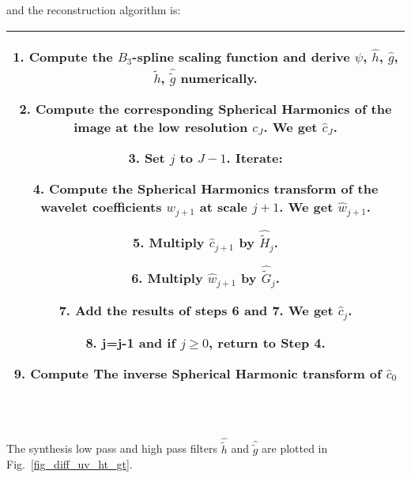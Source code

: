 and the reconstruction algorithm is:
\begin{center}
\begin{tabular}{|c|} \hline
\begin{minipage}[b]{5.3in}
\vspace{0.1in}

\small{
\textsf{1. Compute the $B_3$-spline scaling function and derive $\hat \psi$, $\hat h$, $\hat g$, ${\hat {\tilde h}}$, ${\hat {\tilde g}}$ numerically.}

\textsf{2. Compute the corresponding Spherical Harmonics of the image at the low resolution $c_J$. We get ${\hat c}_J$.}

\textsf{3. Set $j$ to $J-1$. Iterate:}

\hspace{0.3in} \textsf{4. Compute the Spherical Harmonics transform of the wavelet coefficients $w_{j+1}$ at scale $j+1$. We get  $\hat{w}_{j+1}$.}

\hspace{0.3in} \textsf{5. Multiply  $\hat{c}_{j+1}$ by ${\widehat {\tilde H}}_j $.}

\hspace{0.3in} \textsf{6. Multiply $\hat{w}_{j+1}$ by $ {\widehat {\tilde G}}_j $.}

\hspace{0.3in} \textsf{7. Add the results of steps 6 and 7. We get $\hat  c_j$.}

\hspace{0.3in} \textsf{8. j=j-1 and if $j \ge  0$, return to Step 4.}

\textsf{9. Compute The inverse Spherical Harmonic transform of $\hat  c_0$}}

\vspace{0.05in}
\end{minipage}
\\\hline
\end{tabular}
\\ \vspace{0.1in}
\end{center}
\linespread{1.3}
The synthesis low pass and high pass filters $\hat{\tilde h}$ and $\hat{\tilde g}$ are plotted in Fig.~\ref{fig_diff_uv_ht_gt}. 

\begin{figure*}[htb]
\centerline{
\hbox{
}}
\caption{On the left, the filter $\hat{\tilde{h}}$, and on the right the 
filter $\hat{\tilde{g}}$.}
\label{fig_diff_uv_ht_gt}
\end{figure*}


